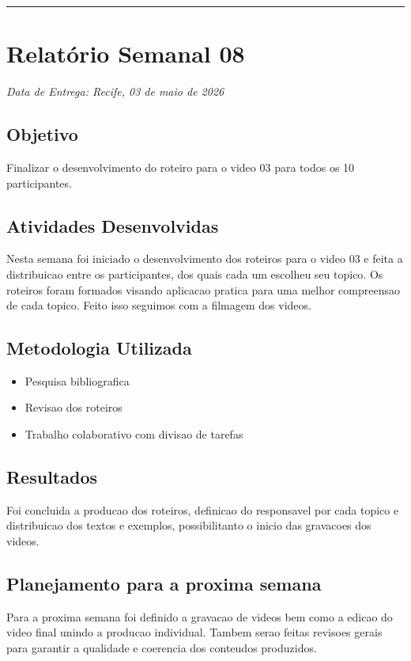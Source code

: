 \bigskip
\hrule
\bigskip

\section{Relatório Semanal 08}
{\centering\noindent\textit{Data de Entrega: Recife, 03 de maio de 2026}\par}\bigskip

\subsection{Objetivo}
Finalizar o desenvolvimento do roteiro para o video 03 para todos os 10 participantes.

\subsection{Atividades Desenvolvidas}
Nesta semana foi iniciado o desenvolvimento dos roteiros para o video 03 e feita a distribuicao entre os participantes, dos quais cada um escolheu seu topico. Os roteiros foram formados visando aplicacao pratica para uma melhor compreensao de cada topico. Feito isso seguimos com a filmagem dos videos.

\subsection{Metodologia Utilizada}
\begin{itemize}
    \item Pesquisa bibliografica
    \item Revisao dos roteiros
    \item Trabalho colaborativo com divisao de tarefas
\end{itemize}

\subsection{Resultados}
Foi concluida a producao dos roteiros, definicao do responsavel por cada topico e distribuicao dos textos e exemplos, possibilitanto o inicio das gravacoes dos videos.

\subsection{Planejamento para a proxima semana}
Para a proxima semana foi definido a gravacao de videos bem como a edicao do video final unindo a producao individual. Tambem serao feitas revisoes gerais para garantir a qualidade e coerencia dos conteudos produzidos.


